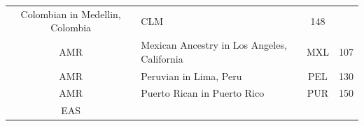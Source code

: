 \documentclass[]{book}
\theoremstyle{definition}
\theoremstyle{definition}
\theoremstyle{definition}
\theoremstyle{remark}
\begin{document}
\begin{longtable}[]{@{}clcc@{}}
\begin{minipage}[t]{0.59\columnwidth}
Colombian in Medellin, Colombia\strut
\end{minipage} & \begin{minipage}[t]{0.09\columnwidth}\centering\strut
CLM\strut
\end{minipage} & \begin{minipage}[t]{0.07\columnwidth}\centering\strut
148\strut
\end{minipage}\tabularnewline
\begin{minipage}[t]{0.14\columnwidth}\centering\strut
AMR\strut
\end{minipage} & \begin{minipage}[t]{0.59\columnwidth}\raggedright\strut
Mexican Ancestry in Los Angeles, California\strut
\end{minipage} & \begin{minipage}[t]{0.09\columnwidth}\centering\strut
MXL\strut
\end{minipage} & \begin{minipage}[t]{0.07\columnwidth}\centering\strut
107\strut
\end{minipage}\tabularnewline
\begin{minipage}[t]{0.14\columnwidth}\centering\strut
AMR\strut
\end{minipage} & \begin{minipage}[t]{0.59\columnwidth}\raggedright\strut
Peruvian in Lima, Peru\strut
\end{minipage} & \begin{minipage}[t]{0.09\columnwidth}\centering\strut
PEL\strut
\end{minipage} & \begin{minipage}[t]{0.07\columnwidth}\centering\strut
130\strut
\end{minipage}\tabularnewline
\begin{minipage}[t]{0.14\columnwidth}\centering\strut
AMR\strut
\end{minipage} & \begin{minipage}[t]{0.59\columnwidth}\raggedright\strut
Puerto Rican in Puerto Rico\strut
\end{minipage} & \begin{minipage}[t]{0.09\columnwidth}\centering\strut
PUR\strut
\end{minipage} & \begin{minipage}[t]{0.07\columnwidth}\centering\strut
150\strut
\end{minipage}\tabularnewline
\begin{minipage}[t]{0.14\columnwidth}\centering\strut
EAS\strut
\end{minipage} & \begin{minipage}[t]{0.59\columnwidth}\raggedright\strut

\end{minipage}
\end{longtable}
\end{document}
